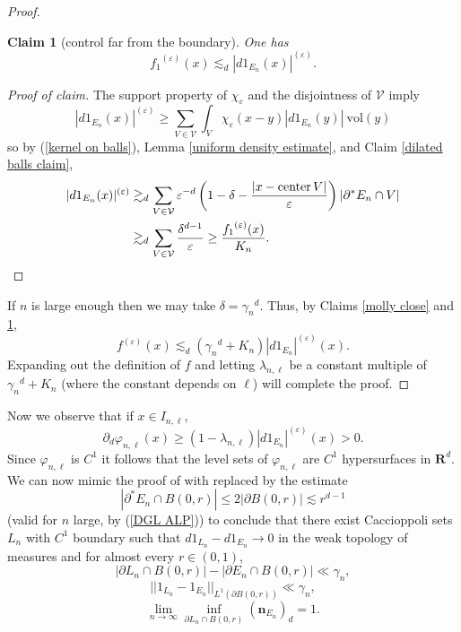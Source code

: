 \documentclass[reqno,12pt,letterpaper]{amsart}
\newcommand{\RR}{\mathbf{R}}
\DeclareMathOperator{\cent}{center}
\newcommand{\normal}{\mathbf n}
\newcommand{\vol}{\mathrm{vol}}
\newtheorem{claim}[theorem]{Claim}
\theoremstyle{definition}
\numberwithin{equation}{section}
\begin{document}
\begin{proof}
\begin{claim}[control far from the boundary]\label{molly far}
One has
$${f_1}^{(\varepsilon)}(x) \lesssim_d |d1_{E_n}(x)|^{(\varepsilon)}.$$
\end{claim}
\begin{proof}[Proof of claim]
The support property of $\chi_\varepsilon$ and the disjointness of $\mathcal V$ imply
$$|d1_{E_n}(x)|^{(\varepsilon)} \geq \sum_{V \in \mathcal V} \int_V \chi_\varepsilon(x - y) |d1_{E_n}(y)| ~\vol(y)$$
so by (\ref{kernel on balls}), Lemma \ref{uniform density estimate}, and Claim \ref{dilated balls claim},
\begin{align*}
|d1_{E_n}(x)|^{(\varepsilon)} &\gtrsim_d \sum_{V \in \mathcal V} \varepsilon^{-d} \left(1 - \delta - \frac{|x - \cent V|}{\varepsilon}\right) |\partial^* E_n \cap V|\\
& \gtrsim_d \sum_{V \in \mathcal V} \frac{\delta^{d - 1}}{\varepsilon} \geq \frac{{f_1}^{(\varepsilon)}(x)}{K_n}. \qedhere
\end{align*}
\end{proof}

If $n$ is large enough then we may take $\delta = {\gamma_n}^d$. Thus, by Claims \ref{molly close} and \ref{molly far},
$$f^{(\varepsilon)}(x) \lesssim_d ({\gamma_n}^d + K_n)|d1_{E_n}|^{(\varepsilon)}(x).$$
Expanding out the definition of $f$ and letting $\lambda_{n,\ell}$ be a constant multiple of ${\gamma_n}^d + K_n$ (where the constant depends on $\ell$) will complete the proof.
\end{proof}

Now we observe that if $x \in I_{n, \ell}$,
$$\partial_d \varphi_{n,\ell}(x) \geq (1 - \lambda_{n, \ell}) |d1_{E_n}|^{(\varepsilon)}(x) > 0.$$
Since $\varphi_{n, \ell}$ is $C^1$ it follows that the level sets of $\varphi_{n, \ell}$ are $C^1$ hypersurfaces in $\RR^d$.
We can now mimic the proof of \cite[(7.22--7.23)]{Giusti77} with \cite[(5.14)]{Giusti77} replaced by the estimate
\begin{equation}\label{Giusti514}
|\partial^* E_n \cap B(0, r)| \leq 2|\partial B(0, r)| \lesssim r^{d - 1}
\end{equation}
(valid for $n$ large, by (\ref{DGL ALP})) to conclude that there exist Caccioppoli sets $L_n$ with $C^1$ boundary such that $d1_{L_n} - d1_{E_n} \to 0$ in the weak topology of measures and for almost every $r \in (0, 1)$,
\begin{equation}\label{Giusti722}
|\partial L_n \cap B(0, r)| - |\partial E_n \cap B(0, r)| \ll \gamma_n,
\end{equation}
\begin{equation}\label{Giusti723}
||1_{L_n} - 1_{E_n}||_{L^1(\partial B(0, r))} \ll \gamma_n,
\end{equation}
\begin{equation}\label{Giusti717}
\lim_{n \to \infty} \inf_{\partial L_n \cap B(0, r)} (\normal_{E_n})_d = 1.
\end{equation}
\end{document}
